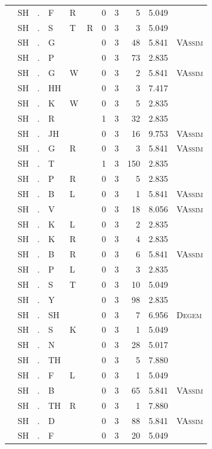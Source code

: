 \documentclass[12pt]{article}
\begin{document}
\begin{longtable}{r@{ } r@{ } c@{ } l@{ } l@{ } l@{ } r r r r l }
 & SH & . & F & R &  & 0 & 3 & 5 & 5.049 &  \\
 & SH & . & S & T & R & 0 & 3 & 3 & 5.049 &  \\
 & SH & . & G &  &  & 0 & 3 & 48 & 5.841 & \textsc{VAssim} \\
 & SH & . & P &  &  & 0 & 3 & 73 & 2.835 &  \\
 & SH & . & G & W &  & 0 & 3 & 2 & 5.841 & \textsc{VAssim} \\
 & SH & . & HH &  &  & 0 & 3 & 3 & 7.417 &  \\
 & SH & . & K & W &  & 0 & 3 & 5 & 2.835 &  \\
 & SH & . & R &  &  & 1 & 3 & 32 & 2.835 &  \\
 & SH & . & JH &  &  & 0 & 3 & 16 & 9.753 & \textsc{VAssim} \\
 & SH & . & G & R &  & 0 & 3 & 3 & 5.841 & \textsc{VAssim} \\
 & SH & . & T &  &  & 1 & 3 & 150 & 2.835 &  \\
 & SH & . & P & R &  & 0 & 3 & 5 & 2.835 &  \\
 & SH & . & B & L &  & 0 & 3 & 1 & 5.841 & \textsc{VAssim} \\
 & SH & . & V &  &  & 0 & 3 & 18 & 8.056 & \textsc{VAssim} \\
 & SH & . & K & L &  & 0 & 3 & 2 & 2.835 &  \\
 & SH & . & K & R &  & 0 & 3 & 4 & 2.835 &  \\
 & SH & . & B & R &  & 0 & 3 & 6 & 5.841 & \textsc{VAssim} \\
 & SH & . & P & L &  & 0 & 3 & 3 & 2.835 &  \\
 & SH & . & S & T &  & 0 & 3 & 10 & 5.049 &  \\
 & SH & . & Y &  &  & 0 & 3 & 98 & 2.835 &  \\
 & SH & . & SH &  &  & 0 & 3 & 7 & 6.956 & \textsc{Degem} \\
 & SH & . & S & K &  & 0 & 3 & 1 & 5.049 &  \\
 & SH & . & N &  &  & 0 & 3 & 28 & 5.017 &  \\
 & SH & . & TH &  &  & 0 & 3 & 5 & 7.880 &  \\
 & SH & . & F & L &  & 0 & 3 & 1 & 5.049 &  \\
 & SH & . & B &  &  & 0 & 3 & 65 & 5.841 & \textsc{VAssim} \\
 & SH & . & TH & R &  & 0 & 3 & 1 & 7.880 &  \\
 & SH & . & D &  &  & 0 & 3 & 88 & 5.841 & \textsc{VAssim} \\
 & SH & . & F &  &  & 0 & 3 & 20 & 5.049 &  \\

\end{longtable}
\end{document}
